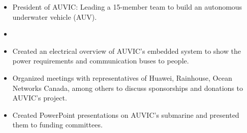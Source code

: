 \documentclass[10pt,a4paper,ragged2e,withhyper]{altacv}
\begin{document}
\begin{paracol}{2}















\begin{itemize}
  \item President of AUVIC: Leading a 15-member team to build an autonomous underwater vehicle (AUV).
  \item 

\end{itemize}
\begin{itemize}
 	\item Created an electrical overview of AUVIC's embedded system to show the power requirements and communication buses to people.
 	\item Organized meetings with representatives of Huawei, Rainhouse, Ocean Networks Canada, among others to discuss sponsorships and donations to AUVIC's project.
 	\item Created PowerPoint presentations on AUVIC's submarine and presented them to funding committees.
\end{itemize}


\end{paracol}
\end{document}
